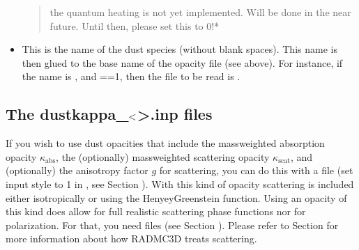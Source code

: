 \documentclass[letterpaper,10pt,english]{sphinxmanual}
\begin{document}
\begin{itemize}
\begin{quote}
the quantum heating is not yet implemented. Will be done in the near
future. Until then, please set this to 0!*
\end{quote}

\item {} 
 This is the name of the
dust species (without blank spaces). This name is then glued to the base
name of the opacity file (see above). For instance, if the name is
, and ==1, then the file to be
read is .

\end{itemize}


\subsection{The {\color{red}\bfseries{}dustkappa\_}\protect\(<\protect\)\textgreater{}\textasciigrave{}.inp files}
\label{\detokenize{inputoutputfiles:the-dustkappa-inp-files}}\label{\detokenize{inputoutputfiles:sec-dustkappa-files}}
If you wish to use dust opacities that include the mass\sphinxhyphen{}weighted absorption
opacity \(\kappa_{\mathrm{abs}}\), the (optionally) mass\sphinxhyphen{}weighted scattering
opacity \(\kappa_{\mathrm{scat}}\), and (optionally) the anisotropy factor \(g\)
for scattering, you can do this with a file  (set input style to 1 in , see Section {\hyperref[\detokenize{inputoutputfiles:sec-dustopac-inp-file}]{}}). With this kind of
opacity scattering is included either isotropically or using the
Henyey\sphinxhyphen{}Greenstein function.  Using an opacity of this kind does 
allow for full realistic scattering phase functions nor for
polarization. For that, you need 
files (see Section {\hyperref[\detokenize{inputoutputfiles:sec-dustkapscatmat-files}]{}}). Please refer to Section
{\hyperref[\detokenize{dustradtrans:sec-scattering}]{}} for more information about how RADMC\sphinxhyphen{}3D treats
scattering.
\end{document}
